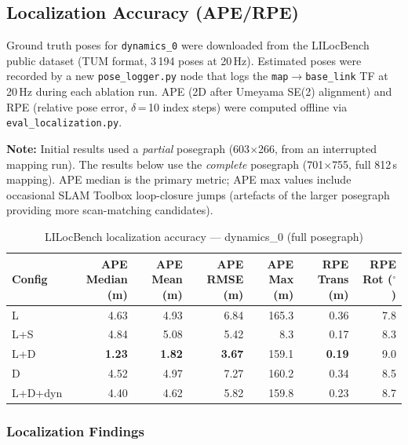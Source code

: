\documentclass[11pt,a4paper]{article}
\begin{document}
\subsection{Localization Accuracy (APE/RPE)}

Ground truth poses for \texttt{dynamics\_0} were downloaded from the
LILocBench public dataset (TUM format, 3\,194 poses at 20\,Hz).
Estimated poses were recorded by a new \texttt{pose\_logger.py} node
that logs the \texttt{map}$\to$\texttt{base\_link} TF at 20\,Hz during
each ablation run.  APE (2D after Umeyama SE(2) alignment) and RPE
(relative pose error, $\delta$\,=\,10 index steps) were computed offline
via \texttt{eval\_localization.py}.

\textbf{Note:} Initial results used a \emph{partial} posegraph (603$\times$266,
from an interrupted mapping run).  The results below use the
\emph{complete} posegraph (701$\times$755, full 812\,s mapping).
APE median is the primary metric; APE max values include occasional
SLAM Toolbox loop-closure jumps (artefacts of the larger posegraph
providing more scan-matching candidates).

\begin{table}[h]
\centering
\caption{LILocBench localization accuracy --- dynamics\_0 (full posegraph)}
\label{tab:lilocbench-localization}
\begin{tabular}{lrrrrrr}
\toprule
\textbf{Config} & \textbf{APE Median (m)} & \textbf{APE Mean (m)}
  & \textbf{APE RMSE (m)} & \textbf{APE Max (m)}
  & \textbf{RPE Trans (m)} & \textbf{RPE Rot ($^\circ$)} \\
\midrule
L       & 4.63 & 4.93 & 6.84 & 165.3 & 0.36 &  7.8 \\
L+S     & 4.84 & 5.08 & 5.42 &   8.3 & 0.17 &  8.3 \\
L+D     & \textbf{1.23} & \textbf{1.82} & \textbf{3.67} & 159.1 & \textbf{0.19} &  9.0 \\
D       & 4.52 & 4.97 & 7.27 & 160.2 & 0.34 &  8.5 \\
L+D+dyn & 4.40 & 4.62 & 5.82 & 159.8 & 0.23 &  8.7 \\
\bottomrule
\end{tabular}
\end{table}

\subsubsection{Localization Findings}
\end{document}
